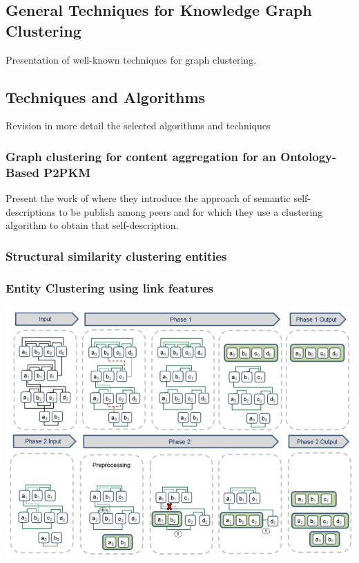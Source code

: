 \documentclass[runningheads]{llncs}
\begin{document}
\subsection{General Techniques for Knowledge Graph Clustering}
Presentation of well-known techniques for graph clustering.

\subsection{Techniques and Algorithms}
Revision in more detail the selected algorithms and techniques 
\subsubsection{Graph clustering for content aggregation for an Ontology-Based P2PKM}
Present the work of \cite{Schmitz} where they introduce the approach of semantic self-descriptions to be publish among peers and for which they use a clustering algorithm to obtain that self-description.

\subsubsection{Structural similarity clustering entities}

\subsubsection{Entity Clustering using link features}

\begin{center}
\includegraphics[width=1\textwidth]{clip_example.png}
\end{center}
\end{document}
